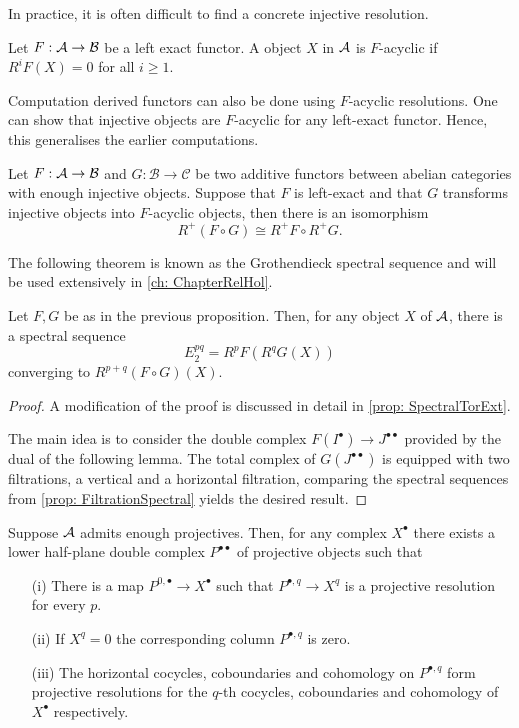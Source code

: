 In practice, it is often difficult to find a concrete injective resolution.
\begin{definition}
 Let $F:\AA \to \mathcal{B}$ be a left exact functor.
 A object $X$ in $\AA$ is $F$-acyclic if $R^iF(X) = 0$ for all $i\geq 1$.
\end{definition}
Computation derived functors can also be done using $F$-acyclic resolutions.
One can show that injective objects are $F$-acyclic for any left-exact functor.
Hence, this generalises the earlier computations.
\begin{proposition}{\cite[Theorem 1.3.18.]{dimca2004sheaves}}\label{prop: GrothendieckIsomorphism}
  Let $F:\AA \to \mathcal{B}$ and $G:\mathcal{B}\to \mathcal{C}$ be two additive functors between abelian categories with enough injective objects. Suppose that $F$ is left-exact and that $G$ transforms injective objects into $F$-acyclic objects, then there is an isomorphism
  $$R^+(F\circ G) \cong R^+F \circ R^+ G.$$
\end{proposition}
The following theorem is known as the Grothendieck spectral sequence and will be used extensively in \cref{ch: ChapterRelHol}.
\begin{theorem}{\cite[Theorem 1.3.19.]{dimca2004sheaves}}\label{thm: GrothendieckSpectral}
  Let $F,G$ be as in the previous proposition. Then, for any object $X$ of $\AA$, there is a spectral sequence
  $$E_2^{pq} = R^pF(R^qG(X)) $$
  converging to $R^{p+q}(F\circ G)(X).$
\end{theorem}
\begin{proof}
  A modification of the proof is discussed in detail in \cref{prop: SpectralTorExt}.

  The main idea is to consider the double complex $F(I^\bullet)\to J^{\bullet\bullet}$ provided by the dual of the following lemma.
  The total complex of $G(J^{\bullet\bullet})$ is equipped with two filtrations, a vertical and a horizontal filtration, comparing the spectral sequences from \cref{prop: FiltrationSpectral} yields the desired result.
\end{proof}
\begin{proposition}{\cite[Lemma 5.7.2.]{weibel1995introduction}}\label{prop: Cartan-Eilenberg}
  Suppose $\AA$ admits enough projectives. Then, for any complex $X^\bullet$ there exists a lower half-plane double complex $P^{\bullet\bullet}$ of projective objects such that
  \begin{enumerate}
    \item[(i)] There is a map $P^{0,\bullet}\to X^\bullet$ such that $P^{\bullet,q}\to X^{q}$ is a projective resolution for every $p$.
    \item[(ii)] If $X^q = 0$ the corresponding column $P^{\bullet,q}$ is zero.
    \item[(iii)] The horizontal cocycles, coboundaries and cohomology on $P^{\bullet,q}$ form projective resolutions for the $q$-th cocycles, coboundaries and cohomology of $X^\bullet$ respectively.
  \end{enumerate}
\end{proposition}

